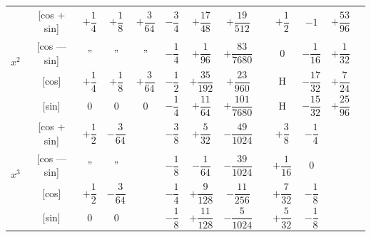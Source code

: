 \documentclass[11pt,a4paper]{book}
\begin{document}
\begin{center}
\begin{tabular}{|c|c|c|c|c|c|c|c|c|c|c|c|c|}
\hline
\multirow{4}{*}{$x^2$} & [cos + sin] & $+\dfrac{1}{4}$ & $+\dfrac{1}{8}$ & $+\dfrac{3}{64}$ & $-\dfrac{3}{4}$ & $+\dfrac{17}{48}$ & $+\dfrac{19}{512}$ & & $+\dfrac{1}{2}$ & $-1$ & $+\dfrac{53}{96}$ \\
& [cos --- sin] & $"$ & $"$ & $"$ & $-\dfrac{1}{4}$ & $+\dfrac{1}{96}$ & $+\dfrac{83}{7680}$ & & $0$ & $-\dfrac{1}{16}$ & $+\dfrac{1}{32}$ \\
& [cos] & $+\dfrac{1}{4}$ & $+\dfrac{1}{8}$ & $+\dfrac{3}{64}$ & $-\dfrac{1}{2}$ & $+\dfrac{35}{192}$ & $+\dfrac{23}{960}$ & & H & $-\dfrac{17}{32}$ & $+\dfrac{7}{24}$ \\
& [sin] & $0$ & $0$ & $0$ & $-\dfrac{1}{4}$ & $+\dfrac{11}{64}$ & $+\dfrac{101}{7680}$ & & H & $-\dfrac{15}{32}$ & $+\dfrac{25}{96}$ \\
\hline
\multirow{4}{*}{$x^3$} & [cos + sin] & $+\dfrac{1}{2}$ & $-\dfrac{3}{64}$ & & $-\dfrac{3}{8}$ & $+\dfrac{5}{32}$ & $-\dfrac{49}{1024}$ & & $+\dfrac{3}{8}$ & $-\dfrac{1}{4}$ \\
& [cos --- sin] & $"$ & $"$ & & $-\dfrac{1}{8}$ & $-\dfrac{1}{64}$ & $-\dfrac{39}{1024}$ & & $+\dfrac{1}{16}$ & $0$ \\
& [cos] & $+\dfrac{1}{2}$ & $-\dfrac{3}{64}$ & & $-\dfrac{1}{4}$ & $+\dfrac{9}{128}$ & $-\dfrac{11}{256}$ & & $+\dfrac{7}{32}$ & $-\dfrac{1}{8}$ \\
& [sin] & $0$ & $0$ & & $-\dfrac{1}{8}$ & $+\dfrac{11}{128}$ & $-\dfrac{5}{1024}$ & & $+\dfrac{5}{32}$ & $-\dfrac{1}{8}$ \\
\hline
\end{tabular}
\end{center}

\newpage

\end{document}
